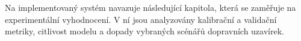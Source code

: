 Na implementovaný systém navazuje následující kapitola, která se zaměřuje na experimentální vyhodnocení. V ní jsou analyzovány kalibrační a validační metriky, citlivost modelu a dopady vybraných scénářů dopravních uzavírek.
%
